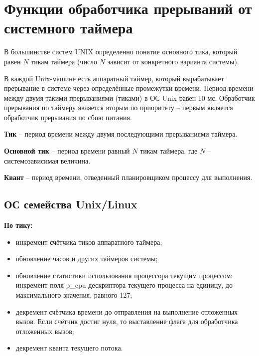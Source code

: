 \chapter{Функции обработчика прерываний от системного таймера}

В большинстве систем UNIX определенно понятие основного тика, который равен $N$ тикам таймера (число $N$ зависит от конкретного варианта системы).

В каждой {\ttfamily Unix}-машине есть аппаратный таймер, который вырабатывает прерывание в системе через определённые промежутки времени. Период времени между двумя такими прерываниями (тиками) в ОС {\ttfamily Unix} равен 10 мс. Обработчик прерывания по таймеру является вторым по приоритету – первым является обработчик прерывания по сбою питания.

\textbf{Тик} -- период времени между двумя последующими прерываниями таймера.

\textbf{Основной тик} -- период времени равный $N$ тикам таймера, где $N$ -- системозависимая величина.

\textbf{Квант} -- период времени, отведенный планировщиком процессу для выполнения.

\section{ОС семейства Unix/Linux}

\textbf{По тику:}
\begin{itemize}
	\item инкремент счётчика тиков аппаратного таймера;
	\item обновление часов и других таймеров системы;
	\item обновление статистики использования процессора текущим процессом: инкремент поля {\ttfamily p\_cpu} дескриптора текущего процесса на единицу, до максимального значения, равного 127;
	\item декремент счётчика времени до отправления на выполнение отложенных вызов. Если счётчик достиг нуля, то выставление флага для обработчика отложенных вызов;
	\item декремент кванта текущего потока.
\end{itemize}

